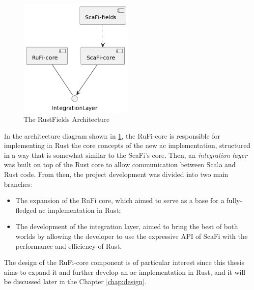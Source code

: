 \begin{figure}[h]
    \centering
    \includegraphics[width=0.5\textwidth]{figures/diagrams/img/rustfields-full-architecture.png}
    \caption{The RustFields Architecture}
    \label{fig:rustfields-architecture}
\end{figure}

In the architecture diagram shown in \cref{fig:rustfields-architecture}, the RuFi-core is responsible for implementing in Rust the core concepts of the new \ac{ac} implementation,
structured in a way that is somewhat similar to the ScaFi's core. Then, an \textit{integration layer} was built on top of the Rust core to allow communication
between Scala and Rust code. From then, the project development was divided into two main branches:
\begin{itemize}
    \item The expansion of the RuFi core, which aimed to serve as a base for a fully-fledged \ac{ac} implementation in Rust;
    \item The development of the integration layer, aimed to bring the best of both worlds by allowing the developer to use the expressive API of ScaFi with the performance and efficiency of Rust.
\end{itemize}

The design of the RuFi-core component is of particular interest since this thesis aims to expand it and further develop an \ac{ac} implementation in Rust, and it will be discussed
later in the Chapter \ref{chap:design}.